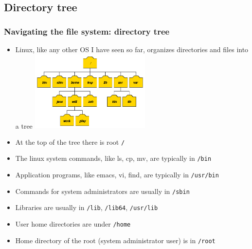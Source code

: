 \documentclass{beamer}
\begin{document}
\subsection{Directory tree}
\begin{frame}[fragile]
  \frametitle{Navigating the file system: directory tree}
\begin{itemize}
\item Linux, like any other OS I have seen so far, organizes directories and files into a tree
\includegraphics[width=6cm]{graphs/tree.png}
\item At the top of the tree there is root {\color{mycolorcli}\verb|/|}
\item The linux system commands, like ls, cp, mv, are typically in {\color{mycolorcli}\verb|/bin|}
\item Application programs, like emacs, vi, find, are typically in {\color{mycolorcli}\verb|/usr/bin|}
\item Commands for system administrators are usually in {\color{mycolorcli}\verb|/sbin|}
\item Libraries are usually in {\color{mycolorcli}\verb|/lib|}, {\color{mycolorcli}\verb|/lib64|}, {\color{mycolorcli}\verb|/usr/lib|}
\item User home directories are under {\color{mycolorcli}\verb|/home|}
\item Home directory of the root (system administrator user) is in {\color{mycolorcli}\verb|/root|}
\end{itemize}
\end{frame}
\end{document}
